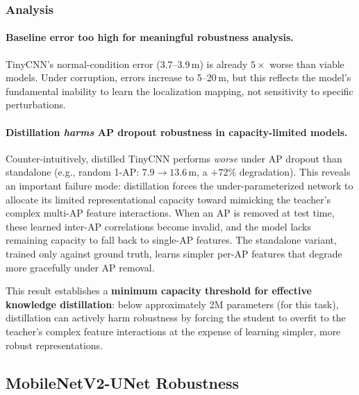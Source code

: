 \documentclass[11pt,a4paper]{article}
\begin{document}
\subsubsection{Analysis}

\paragraph{Baseline error too high for meaningful robustness analysis.}
TinyCNN's normal-condition error (3.7--3.9\,m) is already $5\times$ worse than viable models.
Under corruption, errors increase to 5--20\,m, but this reflects the model's fundamental inability to learn the localization mapping, not sensitivity to specific perturbations.

\paragraph{Distillation \emph{harms} AP dropout robustness in capacity-limited models.}
Counter-intuitively, distilled TinyCNN performs \emph{worse} under AP dropout than standalone (e.g., random 1-AP: $7.9 \to 13.6$\,m, a $+72\%$ degradation).
This reveals an important failure mode: distillation forces the under-parameterized network to allocate its limited representational capacity toward mimicking the teacher's complex multi-AP feature interactions.
When an AP is removed at test time, these learned inter-AP correlations become invalid, and the model lacks remaining capacity to fall back to single-AP features.
The standalone variant, trained only against ground truth, learns simpler per-AP features that degrade more gracefully under AP removal.

This result establishes a \textbf{minimum capacity threshold for effective knowledge distillation}: below approximately 2M parameters (for this task), distillation can actively harm robustness by forcing the student to overfit to the teacher's complex feature interactions at the expense of learning simpler, more robust representations.


\subsection{MobileNetV2-UNet Robustness}
\end{document}
